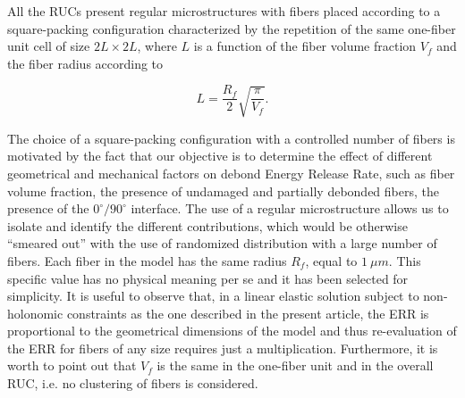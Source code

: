 All the RUCs present regular microstructures with fibers placed according to a square-packing configuration characterized by the repetition of the same one-fiber unit cell of size $2L\times2L$, where $L$ is a function of the fiber volume fraction $V_{f}$ and the fiber radius according to

\begin{equation}\label{paperC:eq:LVf}
L=\frac{R_{f}}{2}\sqrt{\frac{\pi}{V_{f}}}.
\end{equation}

The choice of a square-packing configuration with a controlled number of fibers is motivated by the fact that our objective is to determine the effect of different geometrical and mechanical factors on debond Energy Release Rate, such as fiber volume fraction, the presence of undamaged and partially debonded fibers, the presence of the $0^{\circ}/90^{\circ}$ interface. The use of a regular microstructure allows us to isolate and identify the different contributions, which would be otherwise ``smeared out'' with the use of randomized distribution with a large number of fibers. Each fiber in the model has the same radius $R_{f}$, equal to $1\ \mu m$. This specific value has no physical meaning per se and it has been selected for simplicity. It is useful to observe that, in a linear elastic solution subject to non-holonomic constraints as the one described in the present article, the ERR is proportional to the geometrical dimensions of the model and thus re-evaluation of the ERR for fibers of any size requires just a multiplication. Furthermore, it is worth to point out that $V_{f}$ is the same in the one-fiber unit and in the overall RUC, i.e. no clustering of fibers is considered.\\

